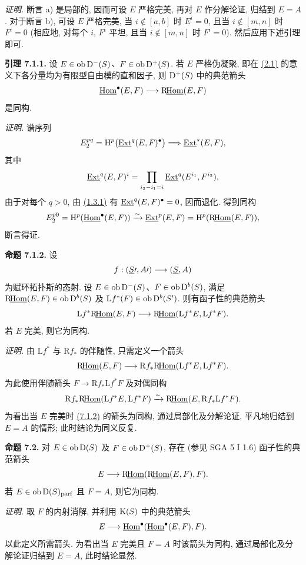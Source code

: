 \emph{证明.} 断言 a) 是局部的, 因而可设 \(E\) 严格完美, 再对 \(E\) 作分解论证, 归结到 \(E=A\). 对于断言 b), 可设 \(E\) 严格完美, 当 \(i\notin[a,b]\) 时 \(E^i=0\), 且当 \(i\notin[m,n]\) 时 \(F^i=0\) (相应地, 对每个 \(i\), \(F^i\) 平坦, 且当 \(i\notin[m,n]\) 时 \(F^i=0\)). 然后应用下述引理即可.

\textbf{引理 7.1.1.} 设 \(E\in\operatorname{ob}\mathrm D^-(S)\)、\(F\in\operatorname{ob}\mathrm D^+(S)\). 若 \(E\) 严格伪凝聚, 即在 \hyperlink{sga6.e01.def.2-1}{(2.1)} 的意义下各分量均为有限型自由模的直和因子, 则 \(\mathrm D^+(S)\) 中的典范箭头
\[
  \underline{\operatorname{Hom}}^\bullet(E,F)\longrightarrow \mathrm R\!\underline{\operatorname{Hom}}(E,F)
\]
是同构.

\emph{证明.} 谱序列
\[
  E_2^{pq}=\mathrm H^p\bigl(\underline{\operatorname{Ext}}^q(E,F)^\bullet\bigr)
  \Longrightarrow \underline{\operatorname{Ext}}^*(E,F),
\]
其中
\[
  \underline{\operatorname{Ext}}^q(E,F)^i
  =\prod_{i_2-i_1=i}\underline{\operatorname{Ext}}^q(E^{i_1},F^{i_2}),
\]
由于对每个 \(q>0\), 由 \hyperlink{sga6.e01.lem.1-3-1}{(1.3.1)} 有
\(\underline{\operatorname{Ext}}^q(E,F)^\bullet=0\), 因而退化. 得到同构
\[
  E_2^{p0}=\mathrm H^p(\underline{\operatorname{Hom}}^\bullet(E,F))
  \xrightarrow{\sim}\underline{\operatorname{Ext}}^p(E,F)=\mathrm H^p(\mathrm R\!\underline{\operatorname{Hom}}(E,F)),
\]
断言得证.

\textbf{命题 7.1.2.} 设
\[
  f:(\underline S\prime,A\prime)\longrightarrow(\underline S,A)
\]
为赋环拓扑斯的态射. 设 \(E\in\operatorname{ob}\mathrm D^-(S)\)、\(F\in\operatorname{ob}\mathrm D^b(S)\), 满足 \(\mathrm R\!\underline{\operatorname{Hom}}(E,F)\in\operatorname{ob}\mathrm D^b(S)\) 及 \(\mathrm Lf^*(F)\in\operatorname{ob}\mathrm D^b(S')\). 则有函子性的典范箭头
\[
  \mathrm Lf^*\mathrm R\!\underline{\operatorname{Hom}}(E,F)
  \longrightarrow
  \mathrm R\!\underline{\operatorname{Hom}}(\mathrm Lf^*E,\mathrm Lf^*F).
\]
若 \(E\) 完美, 则它为同构.

\emph{证明.} 由 \(\mathrm Lf^*\) 与 \(\mathrm Rf_*\) 的伴随性, 只需定义一个箭头
\[
  \mathrm R\!\underline{\operatorname{Hom}}(E,F)
  \longrightarrow
  \mathrm Rf_*\mathrm R\!\underline{\operatorname{Hom}}(\mathrm Lf^*E,\mathrm Lf^*F).
\]
为此使用伴随箭头 \(F\to\mathrm Rf_*\mathrm Lf^*F\) 及对偶同构
\[
  \mathrm Rf_*\mathrm R\!\underline{\operatorname{Hom}}(\mathrm Lf^*E,\mathrm Lf^*F)
  \xrightarrow{\sim}
  \mathrm R\!\underline{\operatorname{Hom}}(E,\mathrm Rf_*\mathrm Lf^*F).
\]
为看出当 \(E\) 完美时 \hyperlink{sga6.e01.prop.7-1-2}{(7.1.2)} 的箭头为同构, 通过局部化及分解论证, 平凡地归结到 \(E=A\) 的情形; 此时结论为同义反复.

\textbf{命题 7.2.} 对 \(E\in\operatorname{ob}\mathrm D(S)\) 及 \(F\in\operatorname{ob}\mathrm D^+(S)\), 存在 (参见 SGA 5 I 1.6) 函子性的典范箭头
\[
  E\longrightarrow\mathrm R\!\underline{\operatorname{Hom}}(\mathrm R\!\underline{\operatorname{Hom}}(E,F),F).
\]
若 \(E\in\operatorname{ob}\mathrm D(S)_{\mathrm{parf}}\) 且 \(F=A\), 则它为同构.

\emph{证明.} 取 \(F\) 的内射消解, 并利用 \(\mathrm K(S)\) 中的典范箭头
\[
  E\longrightarrow \underline{\operatorname{Hom}}^\bullet(\underline{\operatorname{Hom}}^\bullet(E,F),F).
\]
以此定义所需箭头. 为看出当 \(E\) 完美且 \(F=A\) 时该箭头为同构, 通过局部化及分解论证归结到 \(E=A\), 此时结论显然.

